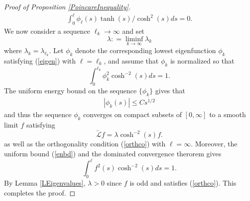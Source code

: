 \documentclass[10pt,a4paper]{amsart}
\newcommand{\mc}{\mathcal}
\newcommand{\wt}{\widetilde}
\begin{document}
\begin{proof}[Proof of Proposition \ref{PoincareInequality}]
\begin{align}
\int_{0}^\ell \phi_{\ell}(s) \tanh(s)/\cosh^{2}(s) ds = 0.
\end{align}
 We now consider a sequence $\ell_k \rightarrow \infty$ and  set 
 \[
 \lambda : = \liminf_{k \rightarrow \infty} \lambda_{k}
 \]
 where $\lambda_{k} = \lambda_{\ell_k}$. Let $\phi_k$ denote the corresponding lowest eigenfunction $\phi_k$ satisfying  (\ref{eigen}) with $\ell  = \ell_k$, and assume that $\phi_k$ is normalized so that 
 \[
 \int_{0}^{\ell_k} \phi^2_{k}\cosh^{-2}(s) ds = 1. 
 \]
   The uniform energy bound on the sequence $\{ \phi_k\}$ gives that 
\begin{align} \label{enbd}
|\phi_k (s)| \leq C s^{1/2}
\end{align}
and thus the sequence $\phi_k$ converges on compact subsets of $[0, \infty]$ to a smooth limit $f$ satisfying
\[
\wt{\mc{L}} f = \lambda \cosh^{-2}(s) f.
\]
as well as the orthogonality condition (\ref{orthco}) with $\ell = \infty$. Moreover, the uniform  bound (\ref{enbd}) and the dominated convergence therorem gives
\[
\int_{0}^\ell f^{2}(s) \cosh^{-2} (s) ds = 1.
\]
By Lemma \ref{LEigenvalues},  $\lambda > 0$ since $f$ is odd and satisfies  (\ref{orthco}). This completes the proof.
\end{proof}
\end{document}
